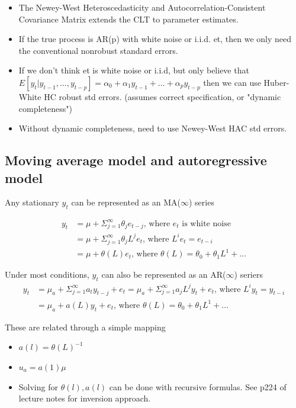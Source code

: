 \documentclass{article}
\begin{document}
\begin{itemize}
  \item The Newey-West Heteroscedasticity and Autocorrelation-Consistent Covariance Matrix extends the CLT to parameter estimates.
  \item If the true process is AR(p) with white noise or i.i.d. et, then we only need the conventional nonrobust standard errors.
  \item If we don't think et is white noise or i.i.d, but only believe that $E[y_t|y_{t-1}, \dots, y_{t-p}] = \alpha_0 + \alpha_1y_{t-1} + \dots + \alpha_py_{t-p}$ then we can use Huber-White HC robust std errors. (assumes correct specification, or "dynamic completeness")
  \item Without dynamic completeness, need to use Newey-West HAC std errors.
\end{itemize}

\subsection{Moving average model and autoregressive model}
Any stationary $y_t$ can be represented as an MA($\infty$) series

\begin{align*}
  y_t &= \mu + \Sigma_{j=1}^\infty \theta_je_{t-j} \textrm{, where $e_t$ is white noise}\\
  &= \mu + \Sigma_{j=1}^\infty \theta_jL^je_t \textrm{, where } L^ie_t = e_{t-i}\\
  &= \mu + \theta(L)e_t \textrm{, where } \theta(L) = \theta_0 + \theta_1L^1 + \dots
\end{align*}

Under most conditions, $y_t$ can also be represented as an AR($\infty$) seriers
\begin{align*}
  y_t &= \mu_a + \Sigma_{j=1}^\infty a_ty_{t-j} + e_t = \mu_a + \Sigma_{j=1}^\infty a_jL^jy_t + e_t \textrm{, where } L^iy_t = y_{t-i}\\
  &= \mu_a + a(L)y_t + e_t \textrm{, where } \theta(L) = \theta_0 + \theta_1L^1 + \dots
\end{align*}

These are related through a simple mapping
\begin{itemize}
  \item $a(l) = \theta(L)^{-1}$
  \item $u_a = a(1)\mu$
  \item Solving for $\theta(l), a(l)$ can be done with recursive formulas. See p224 of lecture notes for inversion approach.
\end{itemize}
\end{document}
